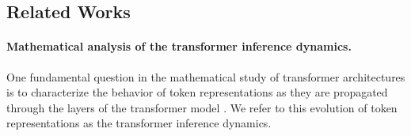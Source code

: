 \documentclass[10pt]{article}
\theoremstyle{definition}
\theoremstyle{definition}
\numberwithin{equation}{section}
\newcommand{\CR}{\mathcal{R}}
\newcommand{\JM}[1]{\marginpar{\scriptsize\textcolor{teal}{JM: {#1}}}}
\newcommand{\JPN}[1]{\marginpar{\scriptsize{JP: {#1}}}}
\begin{document}

    



\subsection{Related Works}

\paragraph{Mathematical analysis of the transformer inference dynamics.}
One fundamental question in the mathematical study of transformer architectures is to characterize the behavior of token representations as they are propagated through the layers of the transformer model \cite{sander2022sinkformers,noci2022signal,geshkovski2023mathematical}. 
We refer to this evolution of token representations as the transformer inference dynamics.
\end{document}
